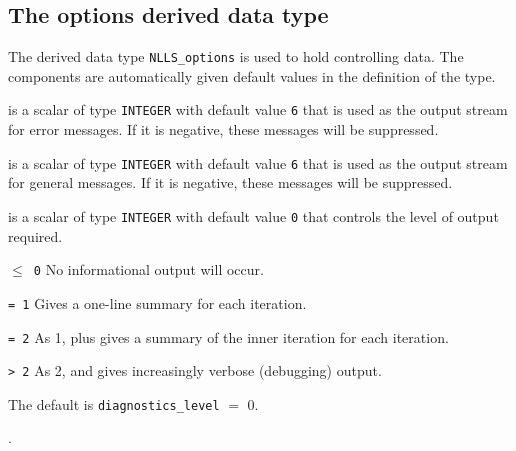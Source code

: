 \documentclass{spec}
\begin{document}
\subsection{The options derived data type}
\label{typeoptions}

The derived data type {\tt NLLS\_options}
is used to hold controlling data. The components  are automatically
given default values in the definition of the type.

\vspace{2mm}

\begin{description}

 is a scalar of type {\tt INTEGER} with default value {\tt 6} that
is used as the output stream for error messages. If it is negative, these
messages will be suppressed.

 is a scalar of type {\tt INTEGER} with default value {\tt 6}
that is used as the output stream for general messages. If it is negative, these messages will be suppressed.

 is a scalar of type {\tt INTEGER} with default value {\tt 0} that
controls the level of output required.
\begin{description}
\item{\tt $\leq$ 0} No informational output will occur.
\item{\tt = 1} Gives a one-line summary for each iteration.
\item{\tt = 2} As 1, plus gives a summary of the inner iteration for each iteration.
\item{\tt > 2} As 2, and gives increasingly verbose (debugging) output.
\end{description}
The default is {\tt diagnostics\_level} $=$ 0.
\end{description}

.
\end{document}
